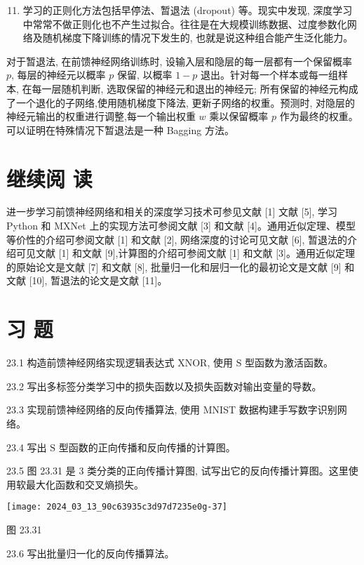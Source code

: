 \documentclass[10pt]{article}
\begin{document}
\begin{CJK*}{UTF8}{bsmi}
\begin{enumerate}
  \setcounter{enumi}{10}
  \item 学习的正则化方法包括早停法、暂退法 (dropout) 等。现实中发现, 深度学习中常常不做正则化也不产生过拟合。往往是在大规模训练数据、过度参数化网络及随机梯度下降训练的情况下发生的, 也就是说这种组合能产生泛化能力。
\end{enumerate}

对于暂退法, 在前馈神经网络训练时, 设输入层和隐层的每一层都有一个保留概率 $p$, 每层的神经元以概率 $p$ 保留, 以概率 $1-p$ 退出。针对每一个样本或每一组样本, 在每一层随机判断, 选取保留的神经元和退出的神经元; 所有保留的神经元构成了一个退化的子网络,使用随机梯度下降法, 更新子网络的权重。预测时, 对隐层的神经元输出的权重进行调整,每一个输出权重 $w$ 乘以保留概率 $p$ 作为最终的权重。可以证明在特殊情况下暂退法是一种 Bagging 方法。

\section*{继续阅 读}
进一步学习前馈神经网络和相关的深度学习技术可参见文献 [1] 文献 [5], 学习 Python 和 MXNet 上的实现方法可参阅文献 [3] 和文献 [4]。通用近似定理、模型等价性的介绍可参阅文献 [1] 和文献 [2], 网络深度的讨论可见文献 [6], 暂退法的介绍可见文献 [1] 和文献 [9],计算图的介绍可参阅文献 [1] 和文献 [3]。通用近似定理的原始论文是文献 [7] 和文献 [8], 批量归一化和层归一化的最初论文是文献 [9] 和文献 [10], 暂退法的论文是文献 [11]。

\section*{习 题}
23.1 构造前馈神经网络实现逻辑表达式 XNOR, 使用 $\mathrm{S}$ 型函数为激活函数。

23.2 写出多标签分类学习中的损失函数以及损失函数对输出变量的导数。

23.3 实现前馈神经网络的反向传播算法, 使用 MNIST 数据构建手写数字识别网络。

23.4 写出 $\mathrm{S}$ 型函数的正向传播和反向传播的计算图。

23.5 图 23.31 是 3 类分类的正向传播计算图, 试写出它的反向传播计算图。这里使用软最大化函数和交叉熵损失。

\begin{center}
\texttt{[image: 2024\_03\_13\_90c63935c3d97d7235e0g-37]}
\end{center}

图 23.31

23.6 写出批量归一化的反向传播算法。


\end{CJK*}
\end{document}
